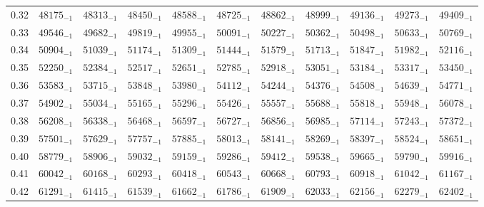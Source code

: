 \documentclass[10pt, a4paper]{article}
\begin{document}
\begin{center}
\begin{longtable}{c || c c c c c | c c c c c}
        0.32 & \({48175}_{-1}\) & \({48313}_{-1}\) & \({48450}_{-1}\) & \({48588}_{-1}\) & \({48725}_{-1}\) & \({48862}_{-1}\) & \({48999}_{-1}\) & \({49136}_{-1}\) & \({49273}_{-1}\) & \({49409}_{-1}\)\\
        0.33 & \({49546}_{-1}\) & \({49682}_{-1}\) & \({49819}_{-1}\) & \({49955}_{-1}\) & \({50091}_{-1}\) & \({50227}_{-1}\) & \({50362}_{-1}\) & \({50498}_{-1}\) & \({50633}_{-1}\) & \({50769}_{-1}\)\\
        0.34 & \({50904}_{-1}\) & \({51039}_{-1}\) & \({51174}_{-1}\) & \({51309}_{-1}\) & \({51444}_{-1}\) & \({51579}_{-1}\) & \({51713}_{-1}\) & \({51847}_{-1}\) & \({51982}_{-1}\) & \({52116}_{-1}\)\\
        0.35 & \({52250}_{-1}\) & \({52384}_{-1}\) & \({52517}_{-1}\) & \({52651}_{-1}\) & \({52785}_{-1}\) & \({52918}_{-1}\) & \({53051}_{-1}\) & \({53184}_{-1}\) & \({53317}_{-1}\) & \({53450}_{-1}\)\\
        0.36 & \({53583}_{-1}\) & \({53715}_{-1}\) & \({53848}_{-1}\) & \({53980}_{-1}\) & \({54112}_{-1}\) & \({54244}_{-1}\) & \({54376}_{-1}\) & \({54508}_{-1}\) & \({54639}_{-1}\) & \({54771}_{-1}\)\\
        0.37 & \({54902}_{-1}\) & \({55034}_{-1}\) & \({55165}_{-1}\) & \({55296}_{-1}\) & \({55426}_{-1}\) & \({55557}_{-1}\) & \({55688}_{-1}\) & \({55818}_{-1}\) & \({55948}_{-1}\) & \({56078}_{-1}\)\\
        0.38 & \({56208}_{-1}\) & \({56338}_{-1}\) & \({56468}_{-1}\) & \({56597}_{-1}\) & \({56727}_{-1}\) & \({56856}_{-1}\) & \({56985}_{-1}\) & \({57114}_{-1}\) & \({57243}_{-1}\) & \({57372}_{-1}\)\\
        0.39 & \({57501}_{-1}\) & \({57629}_{-1}\) & \({57757}_{-1}\) & \({57885}_{-1}\) & \({58013}_{-1}\) & \({58141}_{-1}\) & \({58269}_{-1}\) & \({58397}_{-1}\) & \({58524}_{-1}\) & \({58651}_{-1}\)\\
        \hline
        0.40 & \({58779}_{-1}\) & \({58906}_{-1}\) & \({59032}_{-1}\) & \({59159}_{-1}\) & \({59286}_{-1}\) & \({59412}_{-1}\) & \({59538}_{-1}\) & \({59665}_{-1}\) & \({59790}_{-1}\) & \({59916}_{-1}\)\\
        0.41 & \({60042}_{-1}\) & \({60168}_{-1}\) & \({60293}_{-1}\) & \({60418}_{-1}\) & \({60543}_{-1}\) & \({60668}_{-1}\) & \({60793}_{-1}\) & \({60918}_{-1}\) & \({61042}_{-1}\) & \({61167}_{-1}\)\\
        0.42 & \({61291}_{-1}\) & \({61415}_{-1}\) & \({61539}_{-1}\) & \({61662}_{-1}\) & \({61786}_{-1}\) & \({61909}_{-1}\) & \({62033}_{-1}\) & \({62156}_{-1}\) & \({62279}_{-1}\) & \({62402}_{-1}\)\\

\end{longtable}
\end{center}
\end{document}
